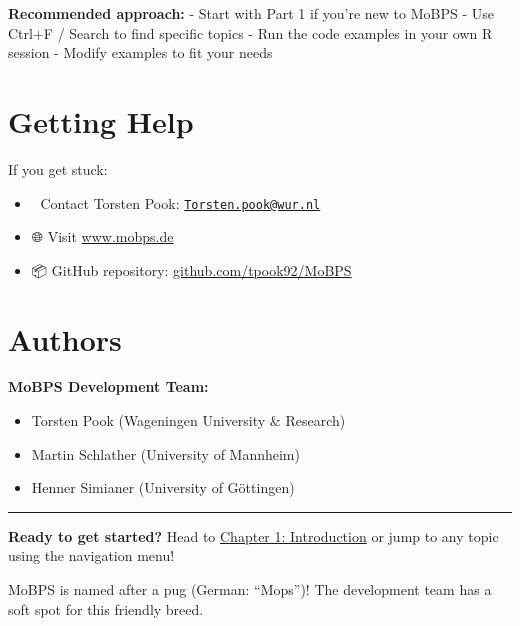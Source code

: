 \documentclass[
  letterpaper,
]{book}
\providecommand{\tightlist}{%
  \setlength{\itemsep}{0pt}\setlength{\parskip}{0pt}}
\begin{document}
\textbf{Recommended approach:} - Start with Part 1 if you're new to
MoBPS - Use Ctrl+F / Search to find specific topics - Run the code
examples in your own R session - Modify examples to fit your needs

\section*{Getting Help}\label{getting-help}


If you get stuck:

\begin{itemize}
\tightlist
\item
  📧 Contact Torsten Pook:
  \href{mailto:Torsten.pook@wur.nl}{\nolinkurl{Torsten.pook@wur.nl}}
\item
  🌐 Visit \href{https://www.mobps.de}{www.mobps.de}
\item
  📦 GitHub repository:
  \href{https://github.com/tpook92/MoBPS}{github.com/tpook92/MoBPS}
\end{itemize}

\section*{Authors}\label{authors}


\textbf{MoBPS Development Team:}

\begin{itemize}
\tightlist
\item
  Torsten Pook (Wageningen University \& Research)
\item
  Martin Schlather (University of Mannheim)
\item
  Henner Simianer (University of Göttingen)
\end{itemize}

\begin{center}\rule{0.5\linewidth}{0.5pt}\end{center}

\textbf{Ready to get started?} Head to
\href{chapters/01-introduction.qmd}{Chapter 1: Introduction} or jump to
any topic using the navigation menu!

\begin{tcolorbox}[enhanced jigsaw, breakable, coltitle=black, opacitybacktitle=0.6, left=2mm, colframe=quarto-callout-note-color-frame, toprule=.15mm, colback=white, bottomtitle=1mm, colbacktitle=quarto-callout-note-color!10!white, opacityback=0, leftrule=.75mm, toptitle=1mm, rightrule=.15mm, arc=.35mm, titlerule=0mm, title=\textcolor{quarto-callout-note-color}{\faInfo}\hspace{0.5em}{The MoBPS Name}, bottomrule=.15mm]

MoBPS is named after a pug (German: ``Mops'')! The development team has
a soft spot for this friendly breed.

\end{tcolorbox}
\end{document}
